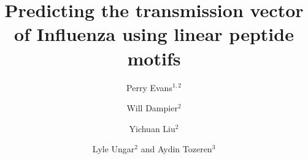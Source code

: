\documentclass[10pt]{bmc_article}
\newenvironment{bmcformat}{\begin{raggedright}\baselineskip20pt\sloppy\setboolean{publ}{false}}{\end{raggedright}\baselineskip20pt\sloppy}
\begin{document}
\begin{bmcformat}

\title{Predicting the transmission vector of Influenza using linear
  peptide motifs}
 

\author{Perry Evans\correspondingauthor$^{1,2}$%
      \and
         Will Dampier\correspondingauthor$^2$%
          \and
         Yichuan Liu\correspondingauthor$^2$%
          \and
         Lyle Ungar\correspondingauthor$^2$%
       and 
         Aydin Tozeren$^3$%
      }
      

\address{%
    \iid(1)Life Sciences Department, Kings College London, Cornwall House,%
        Waterloo Road, London, UK\\
    \iid(2)Department of Zoology, Cambridge, Waterloo Road, London, UK\\
    \iid(3)Marine Ecology Department, Institute of Marine Sciences Kiel, %
        D\"{u}sternbrooker Weg 20, 24105 Kiel, Germany
}%

\maketitle



\end{bmcformat}
\end{document}
